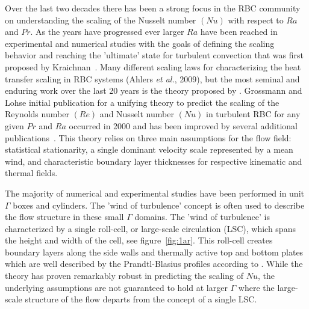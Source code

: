 \documentclass[11pt]{article}
\begin{document}
Over the last two decades there has been a strong focus in the RBC community on understanding the scaling of the Nusselt number $(Nu)$ with respect to $Ra$ and $Pr$.  
As the years have progressed ever larger $Ra$ have been reached in experimental and numerical studies with the goals of defining the scaling behavior and reaching the 'ultimate' state for turbulent convection that was first proposed by Kraichnan~\cite{kraichnan1962turbulent}.  
Many different scaling laws for characterizing the heat transfer scaling in RBC systems (Ahlers \textit{et al.}, 2009), but the most seminal and enduring work over the last 20 years is the theory proposed by \cite{grossmann2000scaling}.   
Grossmann and Lohse initial publication for a unifying theory to predict the scaling of the Reynolds number $(Re)$ and Nusselt number $(Nu)$ in turbulent RBC for any given $Pr$ and $Ra$ occurred in 2000 and has been improved by several additional publications~\cite{grossmann2001thermal,grossmann2002prandtl,grossmann2003geometry,grossmann2004fluctuations,stevens2013unifying}.  
This theory relies on three main assumptions for the flow field: statistical stationarity, a single dominant velocity scale represented by a mean wind, and characteristic boundary layer thicknesses for respective kinematic and thermal fields. 
  
The majority of numerical and experimental studies have been performed in unit $\Gamma$ boxes and cylinders.  The 'wind of turbulence' concept is often used to describe the flow structure in these small $\Gamma$ domains.  
The 'wind of turbulence' is characterized by a single roll-cell, or large-scale circulation (LSC), which spans the height and width of the cell, see figure~\ref{fig:1ar}.  This roll-cell creates boundary layers along the side walls and thermally active top and bottom plates which are well described by the Prandtl-Blasius profiles according to \cite{grossmann2000scaling}.  
While the theory has proven remarkably robust in predicting the scaling of $Nu$, the underlying assumptions are not guaranteed to hold at larger $\Gamma$ where the large-scale structure of the flow departs from the concept of a single LSC.

\end{document}
